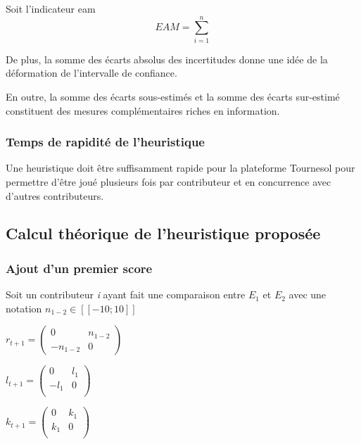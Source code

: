 Soit l'indicateur \gls{eam}
\begin{equation}
EAM= \sum_{i=1}^{n}
\end{equation}



De plus, la somme des écarts absolus des incertitudes donne une idée de la déformation de l'intervalle de confiance.


En outre, la somme des écarts sous-estimés et la somme des écarts sur-estimé constituent des mesures complémentaires riches en information.

\subsubsection{Temps de rapidité de l'heuristique}

Une heuristique doit être suffisamment rapide pour la plateforme Tournesol pour permettre d'être joué plusieurs fois par contributeur et en concurrence avec d'autres contributeurs.


\subsection{Calcul théorique de l'heuristique proposée}

\subsubsection{Ajout d'un premier score}

Soit un contributeur \textit{i} ayant fait une comparaison entre $E_{1}$ et $E_{2}$ avec une notation $n_{1-2} \in [\![-10;10]\!]$

$r_{t+1}= \begin{pmatrix}
0 & n_{1-2} \\
-n_{1-2} & 0 
\end{pmatrix}$

$l_{t+1}= \begin{pmatrix}
0 & l_1 \\
-l_1 & 0 \\
\end{pmatrix}
$

$k_{t+1}= \begin{pmatrix}
0 & k_1 \\
k_1 & 0 \\
\end{pmatrix}
$


